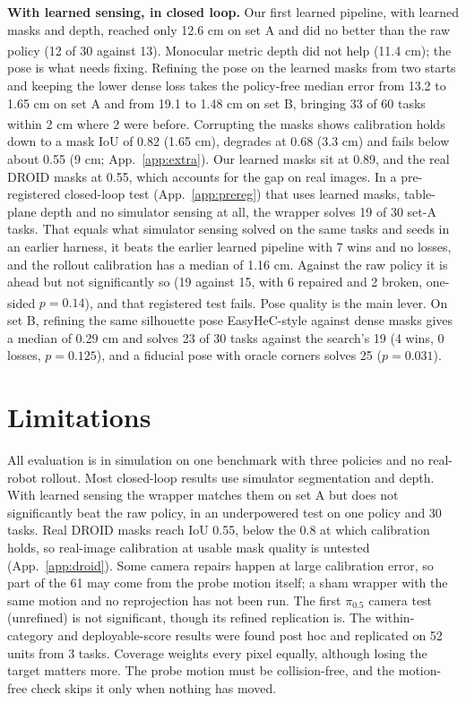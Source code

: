 \documentclass{article}
\newcommand{\pihalf}{$\pi_{0.5}$}
\newcommand{\ph}{\textsuperscript{\dag}}
\begin{document}
\textbf{With learned sensing, in closed loop.} Our first learned pipeline, with learned masks and depth, reached only
12.6 cm on set A and did no better than the raw policy (12 of 30 against 13). Monocular metric depth\ph{} did not help (11.4 cm); the
pose is what needs fixing. Refining the pose on the learned
masks from two starts and keeping the lower dense loss takes the policy-free median error from 13.2 to 1.65 cm on set A
and from 19.1 to 1.48 cm on set B, bringing 33 of 60 tasks within 2 cm where 2 were before. Corrupting the masks\ph{} shows calibration holds down to a mask IoU of
0.82 (1.65 cm), degrades at 0.68 (3.3 cm) and fails below about 0.55 (9 cm; App.~\ref{app:extra}). Our
learned masks sit at 0.89, and the real DROID masks at 0.55, which accounts for the gap on real images. In a pre-registered closed-loop
test (App.~\ref{app:prereg}) that uses learned masks, table-plane depth and no simulator sensing at all, the wrapper
solves 19 of 30 set-A tasks. That equals what simulator sensing solved on the same tasks and seeds in an earlier
harness, it beats the earlier learned pipeline with 7 wins and no losses, and the rollout calibration has a median of
1.16 cm. Against the raw policy it is ahead but not significantly so (19 against 15, with 6 repaired and 2 broken,
one-sided $p = 0.14$), and that registered test fails. Pose quality is the main lever\ph. On set B, refining the same
silhouette pose EasyHeC-style against dense masks gives a median of 0.29 cm and solves 23 of 30 tasks against the
search's 19 (4 wins, 0 losses, $p = 0.125$), and a fiducial pose with oracle corners solves 25 ($p = 0.031$).

\section{Limitations}
\label{sec:limits}
All evaluation is in simulation on one benchmark with three policies and no real-robot rollout. Most closed-loop
results use simulator segmentation and depth. With learned sensing the wrapper matches them on set A but does not
significantly beat the raw policy, in an underpowered test on one policy and 30 tasks. Real DROID masks reach IoU 0.55,
below the 0.8 at which calibration holds, so real-image calibration at usable mask quality is untested
(App.~\ref{app:droid}). Some camera repairs happen at large calibration error, so part of the 61 may come from the
probe motion itself; a sham wrapper with the same motion and no reprojection has not been run. The first \pihalf{}
camera test (unrefined) is not significant, though its refined replication is. The within-category and
deployable-score results were found post hoc and replicated on 52 units from 3 tasks. Coverage weights every pixel
equally, although losing the target matters more. The probe motion must be collision-free, and the motion-free check
skips it only when nothing has moved.
\end{document}
